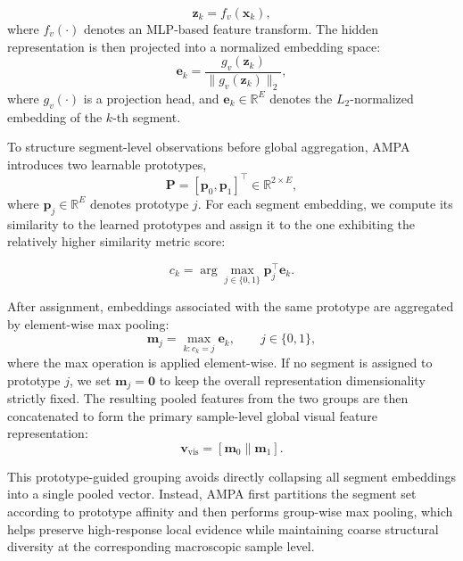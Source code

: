 \documentclass[sigconf,screen,review,anonymous]{acmart}
\begin{document}
\begin{equation}
\mathbf{z}_k = f_v(\mathbf{x}_k),
\end{equation}
where $f_v(\cdot)$ denotes an MLP-based feature transform. The hidden representation is then projected into a normalized embedding space:
\begin{equation}
\mathbf{e}_k = \frac{g_v(\mathbf{z}_k)}{\|g_v(\mathbf{z}_k)\|_2},
\end{equation}
where $g_v(\cdot)$ is a projection head, and $\mathbf{e}_k \in \mathbb{R}^{E}$ denotes the $L_2$-normalized embedding of the $k$-th segment.

To structure segment-level observations before global aggregation, AMPA introduces two learnable prototypes,
\begin{equation}
\mathbf{P} = [\mathbf{p}_0,\mathbf{p}_1]^\top \in \mathbb{R}^{2 \times E},
\end{equation}
where $\mathbf{p}_j \in \mathbb{R}^{E}$ denotes prototype $j$. For each segment embedding, we compute its similarity to the learned prototypes and assign it to the one exhibiting the relatively higher similarity metric score:

\begin{equation}
c_k = \arg\max_{j \in \{0,1\}} \mathbf{p}_j^\top \mathbf{e}_k .
\label{eq:prototype_assign}
\end{equation}

After assignment, embeddings associated with the same prototype are aggregated by element-wise max pooling:
\begin{equation}
\mathbf{m}_j = \max_{k:c_k=j}\mathbf{e}_k, 
\qquad j \in \{0,1\},
\end{equation}
where the max operation is applied element-wise. If no segment is assigned to prototype $j$, we set $\mathbf{m}_j=\mathbf{0}$ to keep the overall representation dimensionality strictly fixed. The resulting pooled features from the two groups are then concatenated to form the primary sample-level global visual feature representation:
\begin{equation}
\mathbf{v}_{\mathrm{vis}} = [\mathbf{m}_0 \parallel \mathbf{m}_1].
\end{equation}

This prototype-guided grouping avoids directly collapsing all segment embeddings into a single pooled vector. Instead, AMPA first partitions the segment set according to prototype affinity and then performs group-wise max pooling, which helps preserve high-response local evidence while maintaining coarse structural diversity at the corresponding macroscopic sample level.
\end{document}
